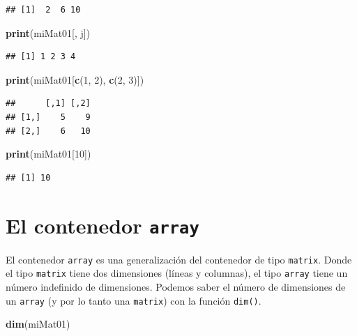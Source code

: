 \documentclass[
]{book}
\newenvironment{Shaded}{\begin{snugshade}}{\end{snugshade}}
\newcommand{\DecValTok}[1]{\textcolor[rgb]{0.00,0.00,0.81}{#1}}
\newcommand{\KeywordTok}[1]{\textcolor[rgb]{0.13,0.29,0.53}{\textbf{#1}}}
\newcommand{\NormalTok}[1]{#1}
\begin{document}
\begin{verbatim}
## [1]  2  6 10
\end{verbatim}

\begin{Shaded}
\begin{Highlighting}[]
\KeywordTok{print}\NormalTok{(miMat01[, j])}
\end{Highlighting}
\end{Shaded}

\begin{verbatim}
## [1] 1 2 3 4
\end{verbatim}

\begin{Shaded}
\begin{Highlighting}[]
\KeywordTok{print}\NormalTok{(miMat01[}\KeywordTok{c}\NormalTok{(}\DecValTok{1}\NormalTok{, }\DecValTok{2}\NormalTok{), }\KeywordTok{c}\NormalTok{(}\DecValTok{2}\NormalTok{, }\DecValTok{3}\NormalTok{)])}
\end{Highlighting}
\end{Shaded}

\begin{verbatim}
##      [,1] [,2]
## [1,]    5    9
## [2,]    6   10
\end{verbatim}

\begin{Shaded}
\begin{Highlighting}[]
\KeywordTok{print}\NormalTok{(miMat01[}\DecValTok{10}\NormalTok{])}
\end{Highlighting}
\end{Shaded}

\begin{verbatim}
## [1] 10
\end{verbatim}

\hypertarget{l014array}{%
\section{\texorpdfstring{El contenedor \texttt{array}}{El contenedor array}}\label{l014array}}

El contenedor \texttt{array} es una generalización del contenedor de tipo \texttt{matrix}. Donde el tipo \texttt{matrix} tiene dos dimensiones (líneas y columnas), el tipo \texttt{array} tiene un número indefinido de dimensiones. Podemos saber el número de dimensiones de un \texttt{array} (y por lo tanto una \texttt{matrix}) con la función \texttt{dim()}.

\begin{Shaded}
\begin{Highlighting}[]
\KeywordTok{dim}\NormalTok{(miMat01)}
\end{Highlighting}
\end{Shaded}
\end{document}
